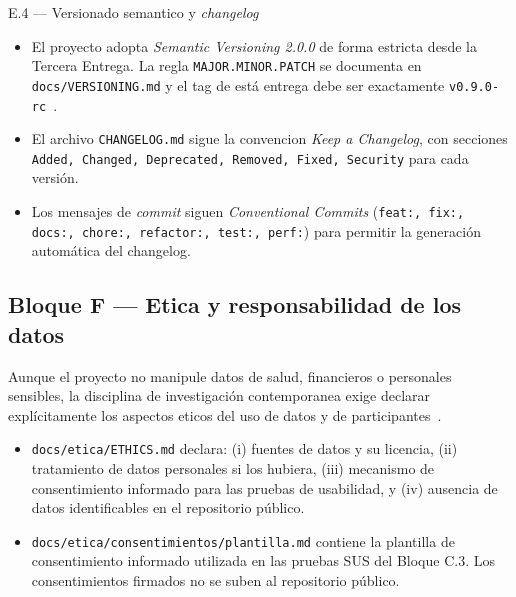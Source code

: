 \documentclass[11pt,a4paper]{article}
\begin{document}
\begin{cajaentregable}{E.4 --- Versionado semantico y \emph{changelog}}
    \begin{itemize}
        \item El proyecto adopta \emph{Semantic Versioning 2.0.0} de forma estricta desde la Tercera Entrega. La regla \texttt{MAJOR.MINOR.PATCH} se documenta en \texttt{docs/VERSIONING.md} y el tag de est\'{a} entrega debe ser exactamente \texttt{v0.9.0-rc}~\cite{prestonwerner2013semver}.
        \item El archivo \texttt{CHANGELOG.md} sigue la convencion \emph{Keep a Changelog}, con secciones \texttt{Added, Changed, Deprecated, Removed, Fixed, Security} para cada versi\'{o}n.
        \item Los mensajes de \emph{commit} siguen \emph{Conventional Commits} (\texttt{feat:, fix:, docs:, chore:, refactor:, test:, perf:}) para permitir la generaci\'{o}n autom\'{a}tica del changelog.
    \end{itemize}
\end{cajaentregable}

\subsection{Bloque F --- Etica y responsabilidad de los datos}

Aunque el proyecto no manipule datos de salud, financieros o personales sensibles, la disciplina de investigaci\'{o}n contemporanea exige declarar expl\'{i}citamente los aspectos eticos del uso de datos y de participantes~\cite{washizaki2024swebok,wohlin2012experimentation}.

\begin{itemize}
    \item \texttt{docs/etica/ETHICS.md} declara: (i) fuentes de datos y su licencia, (ii) tratamiento de datos personales si los hubiera, (iii) mecanismo de consentimiento informado para las pruebas de usabilidad, y (iv) ausencia de datos identificables en el repositorio p\'{u}blico.
    \item \texttt{docs/etica/consentimientos/plantilla.md} contiene la plantilla de consentimiento informado utilizada en las pruebas SUS del Bloque C.3. Los consentimientos firmados no se suben al repositorio p\'{u}blico.
\end{itemize}

\end{document}
